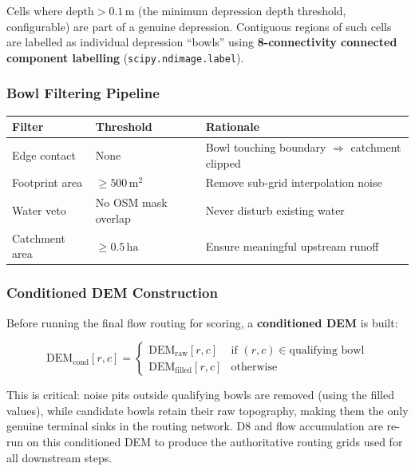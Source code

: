 \documentclass[12pt,a4paper]{article}
\begin{document}
Cells where $\text{depth} > 0.1\,\text{m}$ (the minimum depression depth threshold,
configurable) are part of a genuine depression. Contiguous regions of such cells are
labelled as individual depression ``bowls'' using \textbf{8-connectivity connected
component labelling} (\texttt{scipy.ndimage.label}).

\subsubsection{Bowl Filtering Pipeline}

\begin{center}
\begin{tabular}{llp{6cm}}
    \toprule
    \textbf{Filter} & \textbf{Threshold} & \textbf{Rationale} \\
    \midrule
    Edge contact      & None              & Bowl touching boundary $\Rightarrow$ catchment clipped \\
    Footprint area    & $\geq 500\,\text{m}^2$  & Remove sub-grid interpolation noise \\
    Water veto        & No OSM mask overlap & Never disturb existing water \\
    Catchment area    & $\geq 0.5\,\text{ha}$   & Ensure meaningful upstream runoff \\
    \bottomrule
\end{tabular}
\end{center}

\subsubsection{Conditioned DEM Construction}
Before running the final flow routing for scoring, a \textbf{conditioned DEM} is built:

\begin{equation}
    \text{DEM}_{\text{cond}}[r,c] = \begin{cases}
        \text{DEM}_{\text{raw}}[r,c]    & \text{if } (r,c) \in \text{qualifying bowl} \\
        \text{DEM}_{\text{filled}}[r,c] & \text{otherwise}
    \end{cases}
\end{equation}

This is critical: noise pits outside qualifying bowls are removed (using the filled
values), while candidate bowls retain their raw topography, making them the only genuine
terminal sinks in the routing network. D8 and flow accumulation are re-run on this
conditioned DEM to produce the authoritative routing grids used for all downstream steps.
\end{document}
